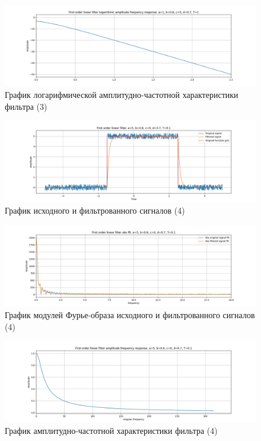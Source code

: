 \documentclass[a4paper, 12pt]{article}
\begin{document}
    \begin{figure}[H]
        \centering
        \includegraphics[scale=0.4]{3_lafr_filtered_linear.png}
        \captionsetup{skip=0pt}
        \caption{График логарифмической амплитудно-частотной характеристики фильтра (3)}
        \label{fig:filinlafr13}
    \end{figure}
    \begin{figure}[H]
        \centering
        \includegraphics[scale=0.4]{4_filtered_linear.png}
        \captionsetup{skip=0pt}
        \caption{График исходного и фильтрованного сигналов (4)}
        \label{fig:filin14}
    \end{figure}
    \begin{figure}[H]
        \centering
        \includegraphics[scale=0.4]{4_abs_filtered_linear.png}
        \captionsetup{skip=0pt}
        \caption{График модулей Фурье-образа исходного и фильтрованного сигналов (4)}
        \label{fig:filinabs14}
    \end{figure}
    \begin{figure}[H]
        \centering
        \includegraphics[scale=0.4]{4_afr_filtered_linear.png}
        \captionsetup{skip=0pt}
        \caption{График амплитудно-частотной характеристики фильтра (4)}
        \label{fig:filinafr14}
    \end{figure}
\end{document}
